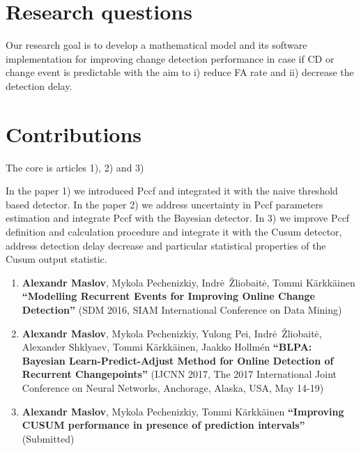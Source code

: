 \section{Research questions}
Our research goal is to develop a mathematical model and its software implementation for improving change detection performance in case if CD or change event is predictable with the aim to i) reduce FA rate and ii) decrease the detection delay. 

\section{Contributions} 

The core is articles 1), 2) and 3)

In the paper 1) we introduced Pccf and integrated it with the naive threshold based detector.
In the paper 2) we address uncertainty in Pccf parameters estimation and integrate Pccf with the Bayesian detector.
In 3) we improve Pccf definition and calculation procedure and integrate it with the Cusum detector, address detection delay decrease and particular statistical properties of the Cusum output statistic.

\begin{enumerate}[leftmargin=0.2cm]

  \item \textbf{Alexandr Maslov}, Mykola Pechenizkiy, Indr\.e~\v{Z}liobait\.e, Tommi K\"{a}rkk\"{a}inen \textbf{``Modelling Recurrent Events for Improving Online Change Detection''} (SDM 2016, SIAM International Conference on Data Mining)

  \item \textbf{Alexandr Maslov}, Mykola Pechenizkiy, Yulong Pei, Indr\.e~\v{Z}liobait\.e, Alexander Shklyaev, Tommi K\"{a}rkk\"{a}inen, Jaakko Hollm{\'e}n \textbf{``BLPA: Bayesian Learn-Predict-Adjust Method for Online  Detection of Recurrent Changepoints''} (IJCNN 2017, The 2017 International Joint Conference on Neural Networks, Anchorage, Alaska, USA, May 14-19)

  \item \textbf{Alexandr Maslov}, Mykola Pechenizkiy, Tommi K\"{a}rkk\"{a}inen \textbf{``Improving CUSUM performance in presence of prediction intervals''} (Submitted)

\end{enumerate}

